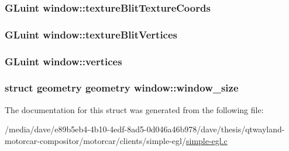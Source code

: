 \hypertarget{structwindow_a666b2eb3384260dab74b71b53cf64ae0}{
\subsubsection[{texture\-Blit\-Texture\-Coords}]{\setlength{\rightskip}{0pt plus 5cm}G\-Luint window\-::texture\-Blit\-Texture\-Coords}}\label{structwindow_a666b2eb3384260dab74b71b53cf64ae0}
\hypertarget{structwindow_a38cefb56177a697abbd43518de429a61}{
\subsubsection[{texture\-Blit\-Vertices}]{\setlength{\rightskip}{0pt plus 5cm}G\-Luint window\-::texture\-Blit\-Vertices}}\label{structwindow_a38cefb56177a697abbd43518de429a61}
\hypertarget{structwindow_aba37ddff444b6d79b605215db77dfd5d}{
\subsubsection[{vertices}]{\setlength{\rightskip}{0pt plus 5cm}G\-Luint window\-::vertices}}\label{structwindow_aba37ddff444b6d79b605215db77dfd5d}
\hypertarget{structwindow_ad2b6c8ed8044b41fd1189a0ce26d539a}{
\subsubsection[{window\-\_\-size}]{\setlength{\rightskip}{0pt plus 5cm}struct {\bf geometry} {\bf geometry} window\-::window\-\_\-size}}\label{structwindow_ad2b6c8ed8044b41fd1189a0ce26d539a}


The documentation for this struct was generated from the following file\-:\begin{DoxyCompactItemize}
\item 
/media/dave/e89b5eb4-\/4b10-\/4edf-\/8ad5-\/0d046a46b978/dave/thesis/qtwayland-\/motorcar-\/compositor/motorcar/clients/simple-\/egl/\hyperlink{simple-egl_8c}{simple-\/egl.\-c}\end{DoxyCompactItemize}
